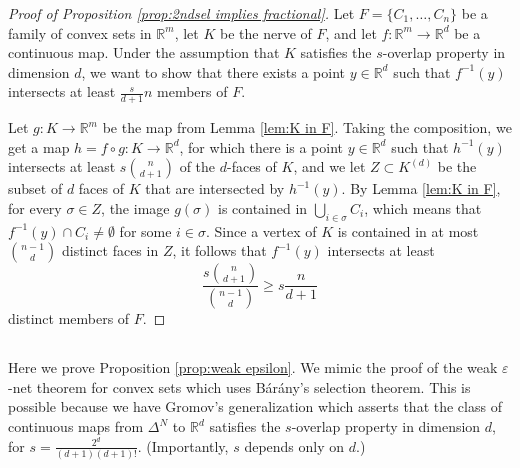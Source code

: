 \documentclass[12pt,a4paper,oneside]{amsart}\sloppy
\theoremstyle{definition}
\newcommand{\faces}[2]{{#1}^{(#2)}}
\newcommand{\inv}[1]{#1^{-1}}
\begin{document}
\begin{proof}[Proof of Proposition \ref{prop:2ndsel implies fractional}]
Let $F = \{C_1, \dots, C_n\}$ be a family of convex sets in $\mathbb{R}^m$, let $K$ be the nerve of $F$, and let $f\colon \mathbb{R}^m \to \mathbb{R}^d$ be a continuous map. Under the assumption that $K$ satisfies the $s$-overlap property in dimension $d$, we want to show that there exists a point $y\in \mathbb{R}^d$ such that $\inv{f}(y)$ intersects at least $\frac{s}{d+1} n$ members of $F$.
 
Let $g \colon K \to \mathbb{R}^m$ be the map from Lemma \ref{lem:K in F}. 
Taking the composition, we get a map $h = f \circ g \colon K \to \mathbb{R}^d$, 
for which there is a point $y\in \mathbb{R}^d$ such that $\inv{h}(y)$ intersects at least $s \binom{n}{d+1}$ of the $d$-faces of $K$, and we let $Z \subset \faces{K}{d}$ be the subset of $d$ faces of $K$ that are intersected by $\inv{h}(y)$. By Lemma \ref{lem:K in F}, for every $\sigma\in Z$, the image $g(\sigma)$ is contained in $\bigcup_{i\in \sigma}C_i$, which means that $\inv{f}(y)\cap C_i\neq \emptyset$ for some $i\in \sigma$. Since a vertex of $K$ is contained in at most $\binom{n-1}{d}$ distinct faces in $Z$, it follows that $\inv{f}(y)$ intersects at least
\[\frac{s\binom{n}{d+1}}{\binom{n-1}{d}}\geq s\frac{n}{d+1}\]
distinct members of $F$. 
\end{proof}



\subsection{} Here we prove Proposition \ref{prop:weak epsilon}.
We mimic the proof of the weak $\varepsilon$-net theorem for convex sets which uses B{\'a}r{\'a}ny's selection theorem. This is possible because we have Gromov's generalization which asserts that the class of continuous maps from $\Delta^N$ to $\mathbb{R}^d$ satisfies the $s$-overlap property in dimension $d$, for $s = \frac{2^d}{(d+1)(d+1)!}$. (Importantly, $s$ depends only on $d$.)
\end{document}
